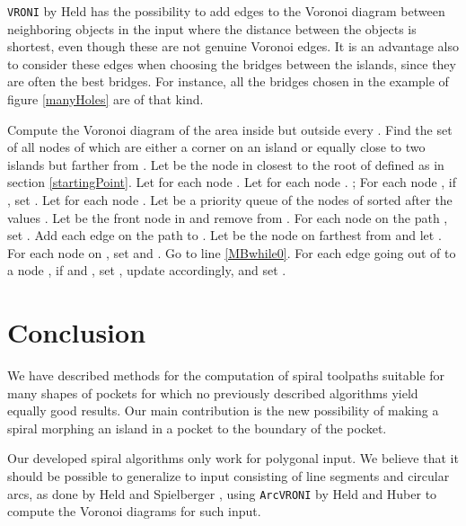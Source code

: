 \documentclass[3p]{elsarticle}
\begin{document}
\texttt{VRONI} by Held \cite{held2001}
has the possibility to add edges to the Voronoi diagram between
neighboring objects in the input where the distance between the objects is shortest,
even though these are not
genuine Voronoi edges. It is an advantage also to consider these edges when choosing
the bridges between the islands,
since they are often the best bridges. For instance, all the bridges chosen in the
example of figure \ref{manyHoles} are of that kind.

\begin{algorithm}[h]
\scriptsize
\LinesNumbered
\DontPrintSemicolon
\SetArgSty{}
Compute the Voronoi diagram  of the area inside  but outside every .\;
Find the set of all nodes  of  which are either a corner on an island or
equally close to two islands but farther from
.\;
Let  be the node in  closest to the root of  defined as in section \ref{startingPoint}.\;
Let  for each node .\;
Let  for each node .\;
; \;
\;
 { 
  For each node , if , set .\;
  Let  for each node .\;
  Let  be a priority queue of the nodes  of  sorted after the values .\;
  \While {} { 
    Let  be the front node in  and remove  from .\;
     {
      For each node  on the path , set .\;
      Add each edge on the path  to .\;
      Let  be the node on  farthest from  and let .\;
      For each node  on , set  and .\;
      Go to line \ref{MBwhile0}.\;
    }
    For each edge going out of  to a node ,
    if  and ,
    set , update  accordingly, and set .\;  
  }
}
\caption{}
\label{makeBridges}
\end{algorithm}

\section{Conclusion}\label{conclusion}
We have described methods for the computation of spiral toolpaths suitable for many
shapes of pockets for which no previously described algorithms yield equally good results.
Our main contribution is the new possibility of making a spiral morphing an island in a pocket
to the boundary of the pocket.

Our developed spiral algorithms only work for polygonal input. We believe that it should be possible to
generalize to input consisting of line segments and circular arcs, as done by
Held and Spielberger \cite{held2009}, using \texttt{ArcVRONI} by Held and Huber \cite{held2009topology}
to compute the Voronoi diagrams for such input.
\end{document}
